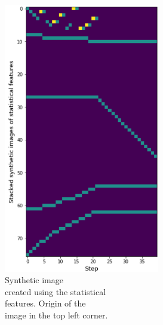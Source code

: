 \begin{minipage}{0.5\textwidth}
	\begin{figure}[H]
	\centering
	\includegraphics[width=6.8cm]{images/synImageOriginal.png}
	\caption[Synthetic image created using the statistical features. Origin of the image in the top left corner.]{Synthetic image \\\hspace{0\textwidth}created using the statistical\\\hspace{0\textwidth} features. Origin of the\\\hspace{0\textwidth} image in the top left corner.}
	\label{fig:synImOr}
\end{figure}
\end{minipage}
